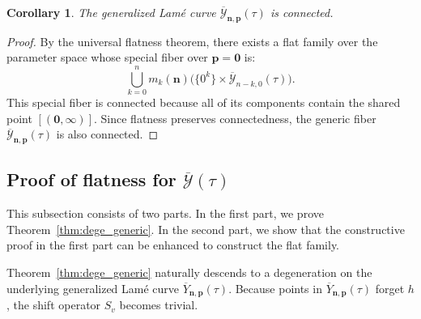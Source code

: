 \documentclass[11pt]{amsart}
\newtheorem{corollary}[theorem]{Corollary}
\theoremstyle{remark}
\numberwithin{equation}{section}
\begin{document}
\begin{corollary}
The generalized Lam\'e curve $\overline{\mathcal{Y}}_{\mathbf{n},\mathbf{p}}(\tau)$ is connected.
\end{corollary}

\begin{proof}
By the universal flatness theorem, there exists a flat family over the parameter space whose special fiber over $\mathbf{p} = \mathbf{0}$ is:
\[
    \bigcup_{k=0}^{n}  m_k(\mathbf{n}) \Big( \{0^k\} \times  \overline{\mathcal{Y}}_{n-k, 0}(\tau) \Big).
\]
This special fiber is connected because all of its components contain the shared point $[(\mathbf{0},\infty)]$. Since flatness preserves connectedness, the generic fiber $\overline{\mathcal{Y}}_{\mathbf{n},\mathbf{p}}(\tau)$ is also connected. 
\end{proof}

\subsection{Proof of flatness for $\overline{\mathcal{Y}}(\tau)$}
This subsection consists of two parts. In the first part, we prove Theorem~\ref{thm:dege_generic}. In the second part, we show that the constructive proof in the first part can be enhanced to construct the flat family. 

Theorem~\ref{thm:dege_generic} naturally descends to a degeneration on the underlying generalized Lam\'e curve $\overline{Y}_{\mathbf{n},\mathbf{p}}(\tau)$. Because points in $\overline{Y}_{\mathbf{n},\mathbf{p}}(\tau)$ forget $h$, the shift operator $S_v$ becomes trivial. 
\end{document}
